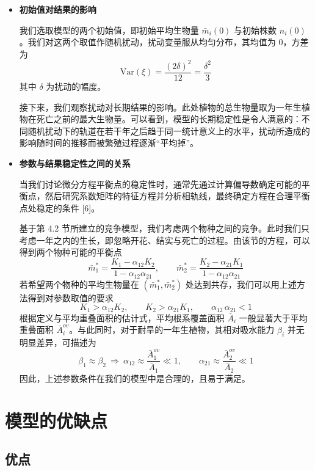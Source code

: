 \documentclass[11pt,a4paper]{ctexart}
\begin{document}
\begin{itemize}
\item \textbf{初始值对结果的影响}

我们选取模型的两个初始值，即初始平均生物量 $\bar m_i(0)$ 与初始株数 $n_i(0)$。我们对这两个取值作随机扰动，扰动变量服从均匀分布，其均值为 0，方差为
\[
\mathrm{Var}\left(\xi\right)=\frac{\left(2\delta\right)^{2}}{12}=\frac{\delta^{2}}{3}
\]
其中 $\delta$ 为扰动的幅度。

接下来，我们观察扰动对长期结果的影响。此处植物的总生物量取为一年生植物在死亡之前的最大生物量。可以看到，模型的长期稳定性是令人满意的：不同随机扰动下的轨道在若干年之后趋于同一统计意义上的水平，扰动所造成的影响随时间的推移而被繁殖过程逐渐“平均掉”。

\item \textbf{参数与结果稳定性之间的关系}

当我们讨论微分方程平衡点的稳定性时，通常先通过计算偏导数确定可能的平衡点，然后研究系数矩阵的特征方程并分析相轨线，最终确定方程在合理平衡点处稳定的条件 [6]。

基于第 4.2 节所建立的竞争模型，我们考虑两个物种之间的竞争。此时我们只考虑一年之内的生长，即忽略开花、结实与死亡的过程。由该节的方程，可以得到两个物种可能的平衡点
\[
\bar m_1^{*}=\frac{K_1-\alpha_{12}K_2}{1-\alpha_{12}\alpha_{21}},\qquad
\bar m_2^{*}=\frac{K_2-\alpha_{21}K_1}{1-\alpha_{12}\alpha_{21}}
\]
若希望两个物种的平均生物量在 $\left(\bar m_1^{*},\bar m_2^{*}\right)$ 处达到共存，我们可以用上述方法得到对参数取值的要求
\[
K_1>\alpha_{12}K_2,\qquad K_2>\alpha_{21}K_1,\qquad \alpha_{12}\,\alpha_{21}<1
\]
根据定义与平均重叠面积的估计式，平均根系覆盖面积 $\bar A_i$ 一般显著大于平均重叠面积 $\bar A_i^{ov}$。与此同时，对于耐旱的一年生植物，其相对吸水能力 $\beta_i$ 并无明显差异，可描述为
\[
\beta_1\approx\beta_2\ \Longrightarrow\ \alpha_{12}\approx\frac{\bar A_1^{ov}}{\bar A_1}\ll 1,\qquad
\alpha_{21}\approx\frac{\bar A_2^{ov}}{\bar A_2}\ll 1
\]
因此，上述参数条件在我们的模型中是合理的，且易于满足。
\end{itemize}

\section{模型的优缺点}

\subsection{优点}
\end{document}
